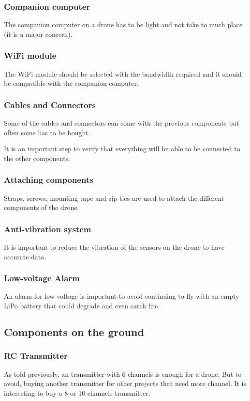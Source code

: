 \subsubsection{Companion computer}
The companion computer on a drone has to be light and not take to much place (it is a major concern).

\subsubsection{WiFi module}
The WiFi module should be selected with the bandwidth required and it should be compatible with the companion computer.

\subsubsection{Cables and Connectors}
Some of the cables and connectors can come with the previous components but often some has to be bought.

It is an important step to verify that everything will be able to be connected to the other components.

\subsubsection{Attaching components}
Straps, screws, mounting tape and zip ties are used to attach the different components of the drone.

\subsubsection{Anti-vibration system}
It is important to reduce the vibration of the sensors on the drone to have accurate data.

\subsubsection{Low-voltage Alarm}
An alarm for low-voltage is important to avoid continuing to fly with an empty LiPo battery that could degrade and even catch fire.

\subsection{Components on the ground}

\subsubsection{RC Transmitter}
As told previously, an transmitter with 6 channels is enough for a drone. But to avoid, buying another transmitter for other projects that need more channel. It is interesting to buy a 8 or 10 channels transmitter.

